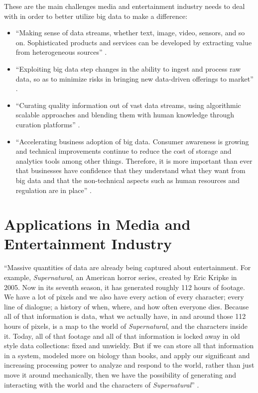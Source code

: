 \documentclass[sigconf]{acmart}
\begin{document}
These are the main challenges media and entertainment industry needs to deal with in order to better utilize big data to make a difference:
\begin{itemize}

  \item ``Making sense of data streams, whether text, image, video, sensors, and so on. Sophisticated products and services can be developed by extracting value from heterogeneous sources'' \cite{Lippell2016sectors}.
  
  \item ``Exploiting big data step changes in the ability to ingest and process raw data, so as to minimize risks in bringing new data-driven offerings to market'' \cite{Lippell2016sectors}.
  
  \item ``Curating quality information out of vast data streams, using algorithmic scalable approaches and blending them with human knowledge through curation platforms'' \cite{Lippell2016sectors}.
  
  \item ``Accelerating business adoption of big data. Consumer awareness is growing and technical improvements continue to reduce the cost of storage and analytics tools among other things. Therefore, it is more important than ever that businesses have confidence that they understand what they want from big data and that the non-technical aspects such as human resources and regulation are in place'' \cite{Lippell2016sectors}. 
  
\end{itemize}

\section{Applications in Media and Entertainment Industry}

``Massive quantities of data are already being captured about entertainment. For example, {\em Supernatural}, an American horror series, created by Eric Kripke in 2005. Now in its seventh season, it has generated roughly 112 hours of footage. We have a lot of pixels and we also have every action of every character; every line of dialogue; a history of when, where, and how often everyone dies. Because all of that information is data, what we actually have, in and around those 112 hours of pixels, is a map to the world of {\em Supernatural}, and the characters inside it. Today, all of that footage and all of that information is locked away in old style data collections: fixed and unwieldy. But if we can store all that information in a system, modeled more on biology than books, and apply our significant and increasing processing power to analyze and respond to the world, rather than just move it around mechanically, then we have the possibility of generating and interacting with the world and the characters of {\em Supernatural}'' \cite{Schlieski2012data}.
\end{document}
